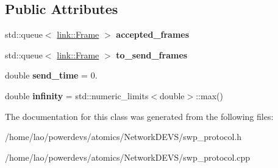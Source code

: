 \subsection*{Public Attributes}
\begin{DoxyCompactItemize}
\item 
std\+::queue$<$ \hyperlink{structlink_1_1Frame}{link\+::\+Frame} $>$ {\bfseries accepted\+\_\+frames}\hypertarget{classswp__protocol_a6ca21ef352c5c0386941af7ff47f889c}{}\label{classswp__protocol_a6ca21ef352c5c0386941af7ff47f889c}

\item 
std\+::queue$<$ \hyperlink{structlink_1_1Frame}{link\+::\+Frame} $>$ {\bfseries to\+\_\+send\+\_\+frames}\hypertarget{classswp__protocol_a83ea71f30f8d84f1248a48615ec3e869}{}\label{classswp__protocol_a83ea71f30f8d84f1248a48615ec3e869}

\item 
double {\bfseries send\+\_\+time} = 0.\hypertarget{classswp__protocol_a03c28f33ff015cccdccf7f082e7cd981}{}\label{classswp__protocol_a03c28f33ff015cccdccf7f082e7cd981}

\item 
double {\bfseries infinity} = std\+::numeric\+\_\+limits$<$double$>$\+::max()\hypertarget{classswp__protocol_a267d11a0dbb19b5699670232d802c93c}{}\label{classswp__protocol_a267d11a0dbb19b5699670232d802c93c}

\end{DoxyCompactItemize}


The documentation for this class was generated from the following files\+:\begin{DoxyCompactItemize}
\item 
/home/lao/powerdevs/atomics/\+Network\+D\+E\+V\+S/swp\+\_\+protocol.\+h\item 
/home/lao/powerdevs/atomics/\+Network\+D\+E\+V\+S/swp\+\_\+protocol.\+cpp\end{DoxyCompactItemize}

